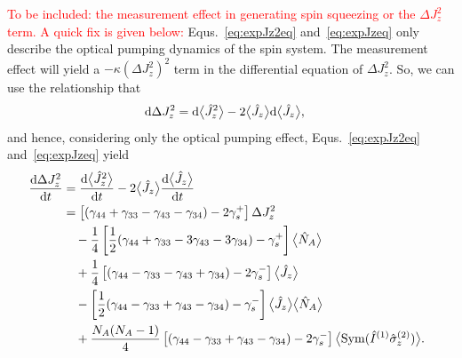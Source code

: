 \textcolor{red}{To be included: the measurement effect in generating spin squeezing or the $ \Delta J_z^2 $ term. A quick fix is given below:}
Equs.~\eqref{eq:expJz2eq} and~\eqref{eq:expJzeq} only describe the optical pumping dynamics of the spin system. The measurement effect will yield a $ -\kappa \left(\Delta J_z^2 \right)^2 $ term in the differential equation of $ \Delta J_z^2 $. So, we can use the relationship that
\begin{align}
\mathrm{d} \Delta J_z^2 &= \mathrm{d} \big\langle \hat{J}_z^2 \big\rangle - 2\big\langle \hat{J}_z \big\rangle\mathrm{d}\big\langle \hat{J}_z \big\rangle,
\end{align}
and hence, considering only the optical pumping effect, Equs.~\eqref{eq:expJz2eq} and~\eqref{eq:expJzeq} yield
\begin{align}
\!\!\!\! \frac{{\mathrm d} {\Delta J_z^2}}{{\mathrm d}t} &= \frac{{\mathrm d} {\big\langle \hat{J}_z^2 \big\rangle}}{{\mathrm d}t} - 2\big\langle \hat{J}_z \big\rangle\frac{{\mathrm d} {\big\langle \hat{J}_z \big\rangle}}{{\mathrm d}t}\\
&= \left[(\gamma_{44}+\gamma_{33}-\gamma_{43}-\gamma_{34} ) -2\gamma_s^+\right] \Delta J_z^2\nonumber\\
&\quad -\frac{1}{4}\left[\frac{1}{2}(\gamma_{44}+\gamma_{33}-3\gamma_{43}-3\gamma_{34} ) -\gamma_s^+\right] \big\langle \hat{N}_A  \big\rangle\nonumber\\
&\quad +\frac{1}{4}\left[(\gamma_{44}-\gamma_{33}-\gamma_{43}+\gamma_{34} ) -2\gamma_s^-\right] \big\langle \hat{J}_z  \big\rangle\nonumber\\
&\quad -\left[\frac{1}{2}(\gamma_{44}-\gamma_{33}+\gamma_{43}-\gamma_{34} ) -\gamma_s^-\right] \big\langle \hat{J}_z  \big\rangle\big\langle \hat{N}_A \big\rangle\nonumber\\
&\quad +\frac{N_A(N_A-1)}{4} \left[ (\gamma_{44}-\gamma_{33}+\gamma_{43}-\gamma_{34})  -2\gamma_s^-\right]\big\langle \mathrm{Sym}(\hat{I}^{(1)}\hat{\sigma}_z^{(2)} )  \big\rangle.
\end{align}

